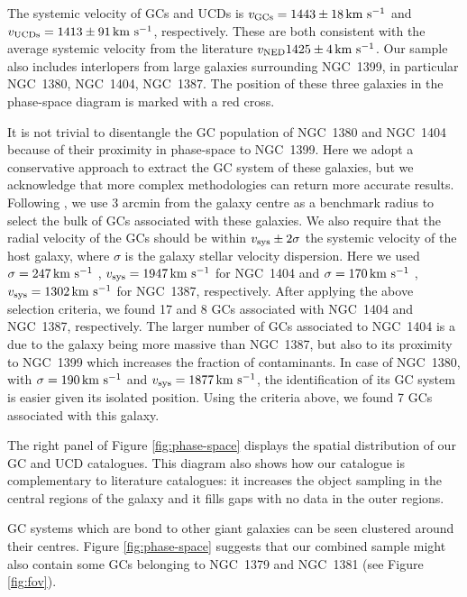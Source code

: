 \documentclass[useAMS,usenatbib]{mn2e}
\newcommand{\kms}{\mbox{\,km~s$^{-1}$}}
\begin{document}
The systemic velocity of GCs and UCDs is $v_{\rm GCs} = 1443 \pm 18 \kms$ and $v_{\rm UCDs} = 1413 \pm 91 \kms$, respectively. These are both consistent with the average systemic velocity from the literature $v_{\rm NED}1425 \pm 4 \kms$. Our sample also includes interlopers from large galaxies surrounding NGC~1399, in particular NGC~1380, NGC~1404, NGC~1387. The position of these three galaxies in the phase-space diagram is marked with a red cross. 

It is not trivial to disentangle the GC population of NGC~1380 and NGC~1404 because of their proximity in phase-space to NGC~1399. 
Here we adopt a conservative approach to extract the GC system of these galaxies, but we acknowledge that more complex methodologies can return more accurate results. Following \citet{Schuberth}, we use 3 arcmin from the galaxy centre as a benchmark radius to select the bulk of GCs associated with these galaxies. We also require that the radial velocity of the GCs should be within $v_{\rm sys} \pm 2\sigma$  the systemic velocity of the host galaxy, where $\sigma$ is the galaxy stellar velocity dispersion. Here we used $\sigma = 247 \kms$  \citep{Vanderbeke11}, $v_{\rm sys} = 1947 \kms$ for NGC~1404 and $\sigma = 170 \kms$ \citep{Wegner03}, $v_{\rm sys} = 1302\kms $ for NGC~1387, respectively. After applying the above selection criteria, we found 17 and 8 GCs associated with NGC~1404 and NGC~1387, respectively. The larger number of GCs associated to NGC~1404 is a due to the galaxy being more massive than NGC~1387, but also to its proximity to NGC~1399 which increases the fraction of contaminants.
In case of NGC~1380, with $\sigma = 190 \kms$  \citep{Vanderbeke11} and $v_{\rm sys} = 1877 \kms$, the identification of its GC system is easier given its isolated position. Using the criteria above, we found 7 GCs associated with this galaxy. 

The right panel of Figure \ref{fig:phase-space} displays the spatial distribution of our GC and UCD catalogues. This diagram also shows how our catalogue is complementary to literature catalogues: it increases the object sampling in the central regions of the galaxy and it fills gaps with no data in the outer regions. 

GC systems which are bond to other giant galaxies can be seen clustered around their centres. Figure \ref{fig:phase-space} suggests that our combined sample might also contain some GCs belonging to NGC~1379 and NGC~1381 (see Figure \ref{fig:fov}). 
\end{document}
